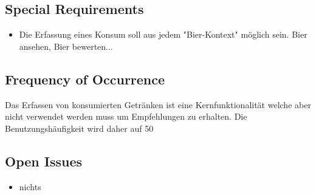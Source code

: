 \documentclass[10pt,a4paper]{scrartcl}
\begin{document}
\subsection*{Special Requirements}

\begin{itemize}
\item Die Erfassung eines Konsum soll aus jedem "Bier-Kontext" möglich sein. Bier ansehen, Bier bewerten...
\end{itemize}



\subsection*{Frequency of Occurrence}

Das Erfassen von konsumierten Getränken ist eine Kernfunktionalität welche aber nicht verwendet werden muss um Empfehlungen zu erhalten. Die Benutzungshäufigkeit wird daher auf 50%

\subsection*{Open Issues}

\begin{itemize}
\item nichts
\end{itemize}
\end{document}

